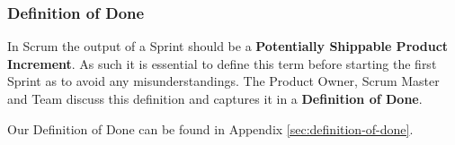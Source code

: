 \subsubsection{Definition of Done}

In Scrum the output of a Sprint should be a \textbf{Potentially Shippable Product Increment}. As such it is essential to define this term before starting the first Sprint as to avoid any misunderstandings. The Product Owner, Scrum Master and Team discuss this definition and captures it in a \textbf{Definition of Done}.

Our Definition of Done can be found in Appendix \ref{sec:definition-of-done}.